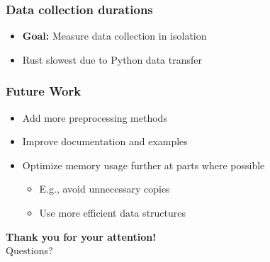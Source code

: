 \documentclass[t,english]{beamer}
\begin{document}
\begin{frame}
  \frametitle{Data collection durations}
  \begin{itemize}
    \item \textbf{Goal:} Measure data collection in isolation
  \end{itemize}
  \begin{itemize}
    \item<3->  Rust slowest due to Python data transfer
  \end{itemize}
\end{frame}

\begin{frame}
  \frametitle{Future Work}
  \begin{itemize}
    \item<1-> Add more preprocessing methods
    \item<2-> Improve documentation and examples
    \item<3-> Optimize memory usage further at parts where possible
          \begin{itemize}
            \item<3-> E.g., avoid unnecessary copies
            \item<3-> Use more efficient data structures
          \end{itemize}
  \end{itemize}
\end{frame}

\begin{frame}
  \centering
  \Huge
  \textbf{Thank you for your attention!}
  \vspace{1cm}
  \\
  \Large
  Questions?
\end{frame}
\end{document}
